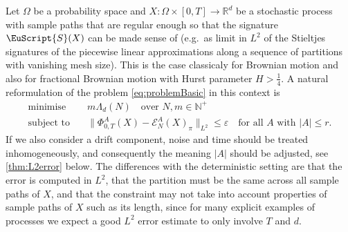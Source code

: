 \documentclass{article}
\def\Sig{\EuScript{S}}
\def\bbR{\mathbb{R}}
\numberwithin{equation}{section}
\theoremstyle{definition}
\theoremstyle{remark}
\begin{document}
Let $\Omega$ be a probability space and $X \colon \Omega \times [0,T] \to \bbR^d$ be a stochastic process with sample paths that are regular enough so that the signature $\Sig(X)$ can be made sense of (e.g.\ as limit in $L^2$ of the Stieltjes signatures of the piecewise linear approximations along a sequence of partitions with vanishing mesh size). This is the case classicaly for Brownian motion and also for fractional Brownian motion with Hurst parameter $H > \frac 14$. A natural reformulation of the problem \eqref{eq:problemBasic} in this context is
\begin{equation}\label{eq:problemStoch}
	\begin{split}
		\text{minimise}\quad & m\Lambda_d(N) \quad \text{over } N, m \in \mathbb N^+ \\
		\text{subject to}\quad & \|\Phi_{0,T}^A(X) - \mathcal E_N^A(X)_\pi \|_{L^2} \leq \varepsilon \quad \text{for all } A \text{ with } |A| \leq r.
	\end{split}
\end{equation}
If we also consider a drift component, noise and time should be treated inhomogeneously, and consequently the meaning $|A|$ should be adjusted, see \autoref{thm:L2error} below. The differences with the deterministic setting are that the error is computed in $L^2$, that the partition must be the same across all sample paths of $X$, and that the constraint may not take into account properties of sample paths of $X$ such as its length, since for many explicit examples of processes we expect a good $L^2$ error estimate to only involve $T$ and $d$.
\end{document}
